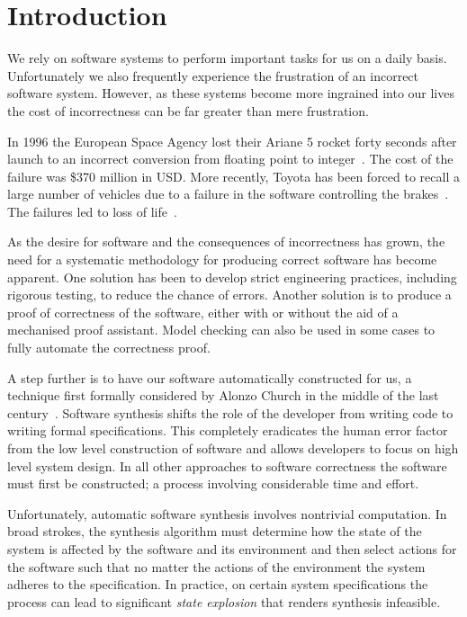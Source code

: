 \chapter{Introduction}

We rely on software systems to perform important tasks for us on a daily basis. Unfortunately we also frequently experience the frustration of an incorrect software system. However, as these systems become more ingrained into our lives the cost of incorrectness can be far greater than mere frustration.

In 1996 the European Space Agency lost their Ariane 5 rocket forty seconds after launch to an incorrect conversion from floating point to integer~\cite{Dowson97}. The cost of the failure was \$370 million in USD. More recently, Toyota has been forced to recall a large number of vehicles due to a failure in the software controlling the brakes~\cite{Parrish13}. The failures led to loss of life~\cite{CBS10}.

As the desire for software and the consequences of incorrectness has grown, the need for a systematic methodology for producing correct software has become apparent. One solution has been to develop strict engineering practices, including rigorous testing, to reduce the chance of errors. Another solution is to produce a proof of correctness of the software, either with or without the aid of a mechanised proof assistant. Model checking can also be used in some cases to fully automate the correctness proof.

A step further is to have our software automatically constructed for us, a technique first formally considered by Alonzo Church in the middle of the last century~\cite{Church62}. Software synthesis shifts the role of the developer from writing code to writing formal specifications. This completely eradicates the human error factor from the low level construction of software and allows developers to focus on high level system design. In all other approaches to software correctness the software must first be constructed; a process involving considerable time and effort.

Unfortunately, automatic software synthesis involves nontrivial computation. In broad strokes, the synthesis algorithm must determine how the state of the system is affected by the software and its environment and then select actions for the software such that no matter the actions of the environment the system adheres to the specification. In practice, on certain system specifications the process can lead to significant \emph{state explosion} that renders synthesis infeasible.


